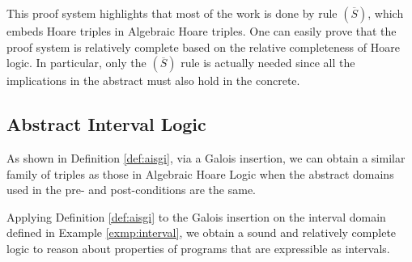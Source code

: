 This proof system highlights that most of the work is done by rule
$(\overline{S})$, which embeds Hoare triples in Algebraic Hoare triples. One can
easily prove that the proof system is relatively complete based on the relative
completeness of Hoare logic. In particular, only the $(\overline{S})$ rule is
actually needed since all the implications in the abstract must also hold in
the concrete.

\subsection{Abstract Interval Logic}

As shown in Definition \ref{def:aisgi}, via a Galois insertion, we can obtain a similar family of triples as those in Algebraic Hoare Logic when the abstract domains used in the pre- and post-conditions are the same.

\begin{example}
  \label{exmp:int-logic}
  Applying Definition \ref{def:aisgi} to the Galois insertion on the interval
  domain defined in Example \ref{exmp:interval}, we obtain a sound and
  relatively complete logic to reason about properties of programs that are
  expressible as intervals.
\end{example}


